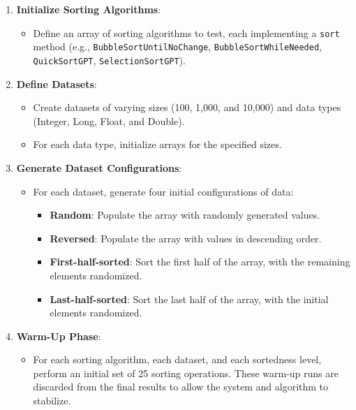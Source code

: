 \documentclass[unicode,11pt,a4paper,oneside,numbers=endperiod,openany]{scrartcl}
\begin{document}
    \begin{enumerate}
        \item \textbf{Initialize Sorting Algorithms}:
        \begin{itemize}
            \item Define an array of sorting algorithms to test, each implementing a \texttt{sort} method (e.g., \texttt{BubbleSortUntilNoChange}, \texttt{BubbleSortWhileNeeded}, \texttt{QuickSortGPT}, \texttt{SelectionSortGPT}).
        \end{itemize}
    
        \item \textbf{Define Datasets}:
        \begin{itemize}
            \item Create datasets of varying sizes (100, 1,000, and 10,000) and data types (Integer, Long, Float, and Double).
            \item For each data type, initialize arrays for the specified sizes.
        \end{itemize}
    
        \item \textbf{Generate Dataset Configurations}:
        \begin{itemize}
            \item For each dataset, generate four initial configurations of data:
            \begin{itemize}
                \item \textbf{Random}: Populate the array with randomly generated values.
                \item \textbf{Reversed}: Populate the array with values in descending order.
                \item \textbf{First-half-sorted}: Sort the first half of the array, with the remaining elements randomized.
                \item \textbf{Last-half-sorted}: Sort the last half of the array, with the initial elements randomized.
            \end{itemize}
        \end{itemize}
    
        \item \textbf{Warm-Up Phase}:
        \begin{itemize}
            \item For each sorting algorithm, each dataset, and each sortedness level, perform an initial set of 25 sorting operations. These warm-up runs are discarded from the final results to allow the system and algorithm to stabilize.
        \end{itemize}
    

\end{enumerate}
\end{document}
